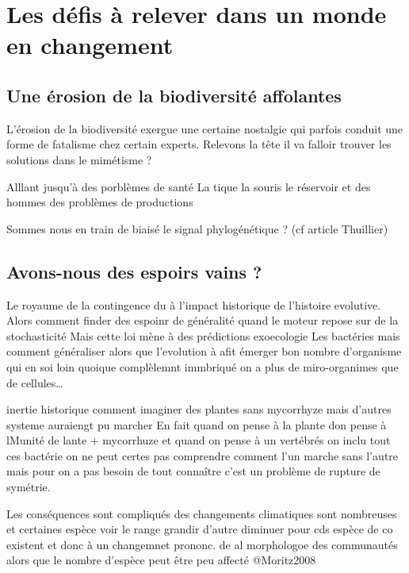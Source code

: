 \section*{Les défis à relever dans un monde en
changement}\label{les-duxe9fis-uxe0-relever-dans-un-monde-en-changement}

\subsection*{Une érosion de la biodiversité
affolantes}\label{une-uxe9rosion-de-la-biodiversituxe9-affolantes}

L'érosion de la biodiversité exergue une certaine nostalgie qui parfois
conduit une forme de fatalisme chez certain experts. Relevons la tête il
va falloir trouver les solutions dans le mimétisme ?

Alllant jusqu'à des porblèmes de santé La tique la souris le réservoir
et des hommes des problèmes de productions

Sommes nous en train de biaisé le signal phylogénétique ? (cf article
Thuillier)

\subsection{Avons-nous des espoirs vains
?}\label{avons-nous-des-espoirs-vains}

Le royaume de la contingence du à l'impact historique de l'histoire
evolutive. Alors comment finder des espoinr de généralité quand le
moteur repose sur de la stochasticité Mais cette loi mène à des
prédictions exoecologie Les bactéries mais comment généraliser alors que
l'evolution à afit émerger bon nombre d'organisme qui en soi loin
quoique complèlemnt immbriqué on a plus de miro-organimes que de
cellules\ldots{}

inertie historique comment imaginer des plantes sans mycorrhyze mais
d'autres systeme auraiengt pu marcher En fait quand on pense à la plante
don pense à lMunité de lante + mycorrhuze et quand on pense à un
vertébrés on inclu tout ces bactérie on ne peut certes pas comprendre
comment l'un marche sans l'autre mais pour on a pas besoin de tout
connaître c'est un problème de rupture de symétrie.

Les conséquences sont compliqués des changements climatiques sont
nombreuses et certaines espèce voir le range grandir d'autre diminuer
pour cds espèce de co existent et donc à un changemnet prononc. de al
morphologoe des communautés alors que le nombre d'espèce peut être peu
affecté @Moritz2008

